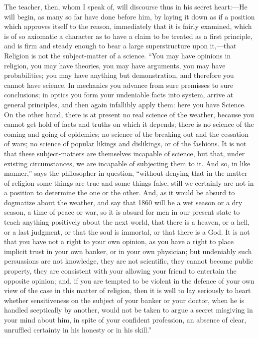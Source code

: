 The teacher, then, whom I speak of, will discourse thus in his
secret heart:—He will begin, as many so far have done before him, by
laying it down as if a position which approves itself to the reason,
immediately that it is fairly examined, which is of so axiomatic a
character as to have a claim to be treated as a first principle, and
is firm and steady enough to bear a large superstructure upon it,—that
Religion is not the subject-matter of a science. ``You may have
opinions in religion, you may have theories, you may have arguments,
you may have probabilities; you may have anything but demonstration,
and therefore you cannot have science. In mechanics you advance from
sure premisses to sure conclusions; in optics you form your undeniable
facts into system, arrive at general principles, and then again
infallibly apply them: here you have Science. On the other hand, there
is at present no real science of the weather, because you cannot get
hold of facts and truths on which it depends; there is no science of
the coming and going of epidemics; no science of the breaking out and
the cessation of wars; no science of popular likings and dislikings,
or of the fashions. It is not that these subject-matters are
themselves incapable of science, but that, under existing
circumstances, we are incapable of subjecting them to it. And so, in
like manner,'' says the philosopher in question, ``without
denying that in the matter of religion some things are true and some
things false, still we certainly are not in a position to determine
the one or the other. And, as it would be absurd to dogmatize about
the weather, and say that 1860 will be a wet season or a dry season, a
time of peace or war, so it is absurd for men in our present state to
teach anything positively about the next world, that there is a
heaven, or a hell, or a last judgment, or that the soul is immortal,
or that there is a God. It is not that you have not a right to your
own opinion, as you have a right to place implicit trust in your own
banker, or in your own physician; but undeniably such persuasions are
not knowledge, they are not scientific, they cannot become public
property, they are consistent with your allowing your friend to
entertain the opposite opinion; and, if you are tempted to be violent
in the defence of your own view of the case in this matter of
religion, then it is well to lay seriously to heart whether
sensitiveness on the subject of your banker or your doctor, when he is
handled sceptically by another, would not be taken to argue a secret
misgiving in your mind about him, in spite of your confident
profession, an absence of clear, unruffled certainty in his honesty or
in his skill.''

